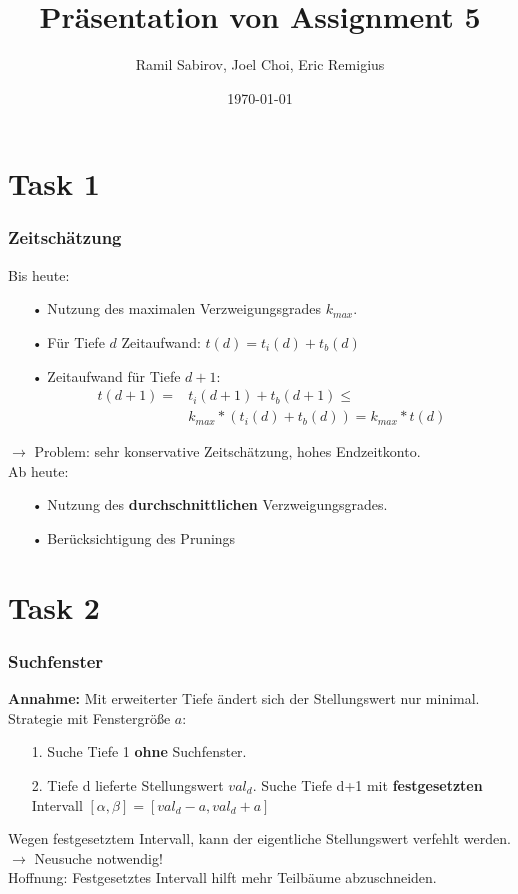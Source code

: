 \documentclass{beamer}
\title[Assignment 5]{Präsentation von Assignment 5} %
\author{Ramil Sabirov, Joel Choi, Eric Remigius} %
\institute[] %
{
RWTH Aachen \\ %
\medskip
\textit{Gruppe3} %
}
\date{\today} %
\begin{document}
\begin{frame}
\titlepage %
\end{frame}


\section{Task 1}

\begin{frame}
\frametitle{Zeitschätzung}
\pause
Bis heute:
\begin{enumerate}
\item[•]Nutzung des maximalen Verzweigungsgrades $k_{max}$.
\item[•]Für Tiefe $d$ Zeitaufwand: $t(d) = t_i(d) + t_b(d)$
\item[•]Zeitaufwand für Tiefe $d+1$:
\begin{align*}
t(d+1) =& t_i(d+1) + t_b(d+1) \leq\\ &k_{max} * (t_i(d) + t_b(d)) = k_{max} * t(d)
\end{align*}
\end{enumerate}
$\rightarrow$ Problem: sehr konservative Zeitschätzung, hohes Endzeitkonto.\\\hfill\break
\pause
Ab heute:
\begin{enumerate}
\item[•]Nutzung des \textbf{durchschnittlichen} Verzweigungsgrades.
\item[•]Berücksichtigung des Prunings
\end{enumerate}
\end{frame}

\section{Task 2}

\begin{frame}
\frametitle{Suchfenster}
\pause
\textbf{Annahme:} Mit erweiterter Tiefe ändert sich der Stellungswert nur minimal.\\\hfill\break
\pause
Strategie mit Fenstergröße $a$:
\begin{enumerate}
\item[1.] Suche Tiefe 1 \textbf{ohne} Suchfenster.
\item[2.] Tiefe d lieferte Stellungswert $val_d$. Suche Tiefe d+1 mit \textbf{festgesetzten} Intervall $[\alpha, \beta] = [val_d - a, val_d + a]$
\end{enumerate}
\hfill\break
Wegen festgesetztem Intervall, kann der eigentliche Stellungswert verfehlt werden.
$\rightarrow$ Neusuche notwendig!\\
\pause
\hfill\break
Hoffnung: Festgesetztes Intervall hilft mehr Teilbäume abzuschneiden.
\end{frame}
\end{document}
